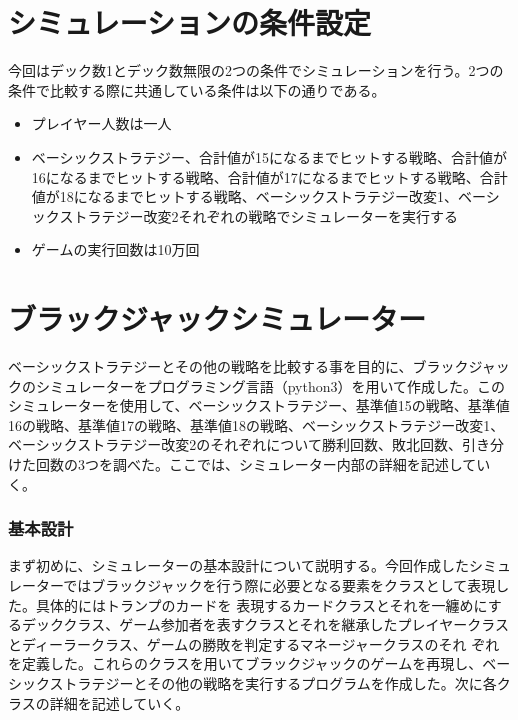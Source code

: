 \section{シミュレーションの条件設定}
今回はデック数1とデック数無限の2つの条件でシミュレーションを行う。2つの条件で比較する際に共通している条件は以下の通りである。
\begin{itemize}
\item プレイヤー人数は一人
\item ベーシックストラテジー、合計値が15になるまでヒットする戦略、合計値が16になるまでヒットする戦略、合計値が17になるまでヒットする戦略、合計値が18になるまでヒットする戦略、ベーシックストラテジー改変1、ベーシックストラテジー改変2それぞれの戦略でシミュレーターを実行する
\item ゲームの実行回数は10万回
\end{itemize}


\section{ブラックジャックシミュレーター}
ベーシックストラテジーとその他の戦略を比較する事を目的に、ブラックジャックのシミュレーターをプログラミング言語（python3）を用いて作成した。このシミュレーターを使用して、ベーシックストラテジー、基準値15の戦略、基準値16の戦略、基準値17の戦略、基準値18の戦略、ベーシックストラテジー改変1、ベーシックストラテジー改変2のそれぞれについて勝利回数、敗北回数、引き分けた回数の3つを調べた。ここでは、シミュレーター内部の詳細を記述していく。



\subsubsection{基本設計}
まず初めに、シミュレーターの基本設計について説明する。今回作成したシミュレーターではブラックジャックを行う際に必要となる要素をクラスとして表現した。具体的にはトランプのカードを
表現するカードクラスとそれを一纏めにするデッククラス、ゲーム参加者を表すクラスとそれを継承したプレイヤークラスとディーラークラス、ゲームの勝敗を判定するマネージャークラスのそれ
ぞれを定義した。これらのクラスを用いてブラックジャックのゲームを再現し、ベーシックストラテジーとその他の戦略を実行するプログラムを作成した。次に各クラスの詳細を記述していく。

